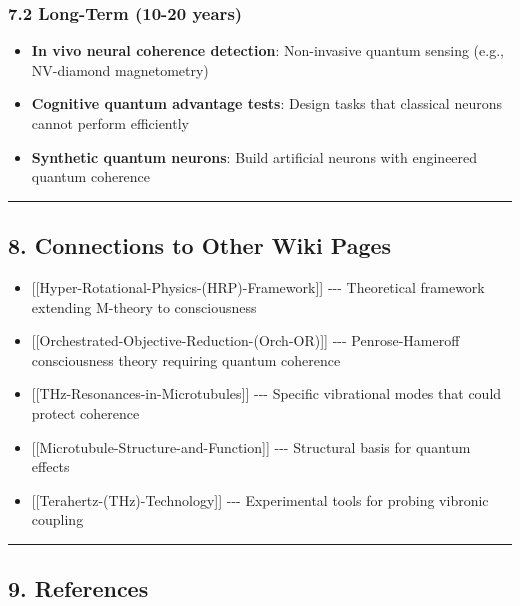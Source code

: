 \subsubsection{7.2 Long-Term (10-20 years)}\label{long-term-10-20-years}

\begin{itemize}
\tightlist
\item
  \textbf{In vivo neural coherence detection}: Non-invasive quantum
  sensing (e.g., NV-diamond magnetometry)
\item
  \textbf{Cognitive quantum advantage tests}: Design tasks that
  classical neurons cannot perform efficiently
\item
  \textbf{Synthetic quantum neurons}: Build artificial neurons with
  engineered quantum coherence
\end{itemize}

\begin{center}\rule{0.5\linewidth}{0.5pt}\end{center}

\subsection{8. Connections to Other Wiki
Pages}\label{connections-to-other-wiki-pages}

\begin{itemize}
\tightlist
\item
  {[}{[}Hyper-Rotational-Physics-(HRP)-Framework{]}{]} -\/-\/-
  Theoretical framework extending M-theory to consciousness
\item
  {[}{[}Orchestrated-Objective-Reduction-(Orch-OR){]}{]} -\/-\/-
  Penrose-Hameroff consciousness theory requiring quantum coherence
\item
  {[}{[}THz-Resonances-in-Microtubules{]}{]} -\/-\/- Specific
  vibrational modes that could protect coherence
\item
  {[}{[}Microtubule-Structure-and-Function{]}{]} -\/-\/- Structural
  basis for quantum effects
\item
  {[}{[}Terahertz-(THz)-Technology{]}{]} -\/-\/- Experimental tools for
  probing vibronic coupling
\end{itemize}

\begin{center}\rule{0.5\linewidth}{0.5pt}\end{center}

\subsection{9. References}\label{references}

